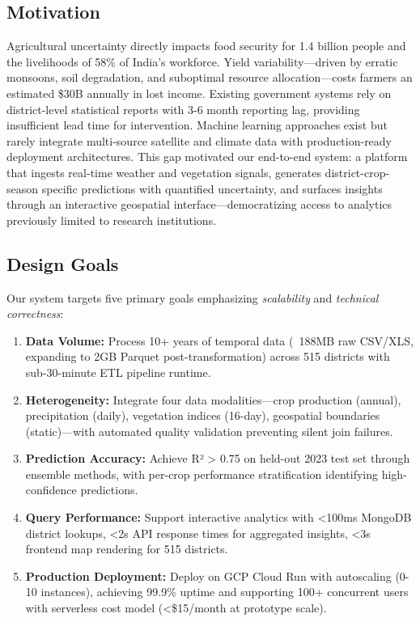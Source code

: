 \documentclass[10pt,a4paper]{article}
\begin{document}
\subsection{Motivation}
Agricultural uncertainty directly impacts food security for 1.4 billion people and the livelihoods of 58\% of India's workforce. Yield variability—driven by erratic monsoons, soil degradation, and suboptimal resource allocation—costs farmers an estimated \$30B annually in lost income. Existing government systems rely on district-level statistical reports with 3-6 month reporting lag, providing insufficient lead time for intervention. Machine learning approaches exist but rarely integrate multi-source satellite and climate data with production-ready deployment architectures. This gap motivated our end-to-end system: a platform that ingests real-time weather and vegetation signals, generates district-crop-season specific predictions with quantified uncertainty, and surfaces insights through an interactive geospatial interface—democratizing access to analytics previously limited to research institutions.

\subsection{Design Goals}
Our system targets five primary goals emphasizing \textit{scalability} and \textit{technical correctness}:

\begin{enumerate}[leftmargin=*,itemsep=1pt]
\item \textbf{Data Volume:} Process 10+ years of temporal data (~188MB raw CSV/XLS, expanding to 2GB Parquet post-transformation) across 515 districts with sub-30-minute ETL pipeline runtime.
\item \textbf{Heterogeneity:} Integrate four data modalities—crop production (annual), precipitation (daily), vegetation indices (16-day), geospatial boundaries (static)—with automated quality validation preventing silent join failures.
\item \textbf{Prediction Accuracy:} Achieve R² > 0.75 on held-out 2023 test set through ensemble methods, with per-crop performance stratification identifying high-confidence predictions.
\item \textbf{Query Performance:} Support interactive analytics with <100ms MongoDB district lookups, <2s API response times for aggregated insights, <3s frontend map rendering for 515 districts.
\item \textbf{Production Deployment:} Deploy on GCP Cloud Run with autoscaling (0-10 instances), achieving 99.9\% uptime and supporting 100+ concurrent users with serverless cost model (<\$15/month at prototype scale).
\end{enumerate}
\end{document}
